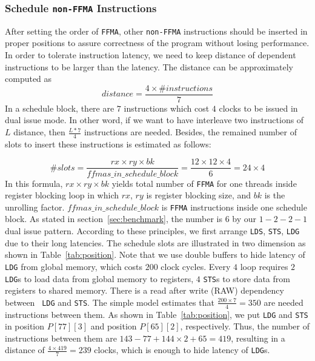 \subsubsection{Schedule {\tt non-FFMA} Instructions}

After setting the order of {\tt FFMA}, other {\tt non-FFMA} instructions should be inserted in proper positions to 
assure
correctness of the program without losing performance. In order to tolerate instruction latency, we need to keep 
distance of dependent instructions to be larger than the latency. The distance can be approximately computed as
\begin{displaymath}
distance = \frac{4\times\#instructions}{7}
\end{displaymath}
In a schedule block, there are $7$ instructions which cost $4$ clocks to be issued in dual issue mode. In other word, 
if we want to have interleave
two instructions of $L$ distance, then $\frac{L*7}{4}$ instructions are needed. Besides, the remained number of slots 
to insert these instructions is estimated as follows:

\begin{displaymath}
\#slots = \frac{rx\times ry\times bk}{ffmas\_in\_schedule\_block}=\frac{12\times 12\times 4}{6}=24\times 4
\end{displaymath}
In this formula, $rx\times ry\times bk$ yields total number of {\tt FFMA} for one threads inside register blocking 
loop in which $rx$, $ry$ is register blocking size, and $bk$ is the unrolling factor.
$ffmas\_in\_schedule\_block$ is {\tt FFMA} instructions inside one schedule block. As stated in section~\ref{sec:benchmark}, the 
number is $6$ by our $1-2-2-1$ dual issue pattern.
According to these principles, we first arrange {\tt LDS}, {\tt STS}, {\tt LDG} due to their long latencies. The
schedule slots are illustrated in two dimension as shown in Table~\ref{tab:position}.
Note that we use double buffers to hide latency of {\tt LDG} from global memory, which costs $200$ clock cycles.
Every $4$ loop requires $2$ {\tt LDG}s to load data from global memory to registers, $4$ {\tt STS}s to store data from 
registers to shared memory. There is a read after write (RAW) dependency between {\tt
LDG} and {\tt STS}. The simple model estimates that $\frac{200\times 7}{4} = 350$ are needed instructions between them.
As shown in Table~\ref{tab:position}, we put {\tt LDG} and  {\tt STS} in position $P[77][3]$ and position $P[65][2]$, 
respectively. Thus, the number of instructions between them are $143-77 + 144\times 2 +
65=419$, resulting in a distance of $\frac{4\times 419}{7}=239$ clocks, which is enough to hide latency of {\tt LDG}s.

